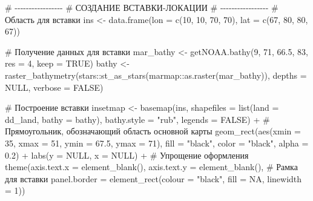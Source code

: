 \documentclass[
  letterpaper,
  DIV=11,
  numbers=noendperiod]{scrreprt}
\newenvironment{Shaded}{\begin{snugshade}}{\end{snugshade}}
\newcommand{\AttributeTok}[1]{\textcolor[rgb]{0.40,0.45,0.13}{#1}}
\newcommand{\CommentTok}[1]{\textcolor[rgb]{0.37,0.37,0.37}{#1}}
\newcommand{\ConstantTok}[1]{\textcolor[rgb]{0.56,0.35,0.01}{#1}}
\newcommand{\DecValTok}[1]{\textcolor[rgb]{0.68,0.00,0.00}{#1}}
\newcommand{\FloatTok}[1]{\textcolor[rgb]{0.68,0.00,0.00}{#1}}
\newcommand{\FunctionTok}[1]{\textcolor[rgb]{0.28,0.35,0.67}{#1}}
\newcommand{\NormalTok}[1]{\textcolor[rgb]{0.00,0.23,0.31}{#1}}
\newcommand{\OtherTok}[1]{\textcolor[rgb]{0.00,0.23,0.31}{#1}}
\newcommand{\SpecialCharTok}[1]{\textcolor[rgb]{0.37,0.37,0.37}{#1}}
\newcommand{\StringTok}[1]{\textcolor[rgb]{0.13,0.47,0.30}{#1}}
\begin{document}
\begin{Shaded}
\begin{Highlighting}[]
\CommentTok{\# {-}{-}{-}{-}{-}{-}{-}{-}{-}{-}{-}{-}{-}{-}{-}{-}{-}}
\CommentTok{\# СОЗДАНИЕ ВСТАВКИ{-}ЛОКАЦИИ}
\CommentTok{\# {-}{-}{-}{-}{-}{-}{-}{-}{-}{-}{-}{-}{-}{-}{-}{-}{-}}
\CommentTok{\# Область для вставки}
\NormalTok{ins }\OtherTok{\textless{}{-}} \FunctionTok{data.frame}\NormalTok{(}\AttributeTok{lon =} \FunctionTok{c}\NormalTok{(}\DecValTok{10}\NormalTok{, }\DecValTok{10}\NormalTok{, }\DecValTok{70}\NormalTok{, }\DecValTok{70}\NormalTok{), }\AttributeTok{lat =} \FunctionTok{c}\NormalTok{(}\DecValTok{67}\NormalTok{, }\DecValTok{80}\NormalTok{, }\DecValTok{80}\NormalTok{, }\DecValTok{67}\NormalTok{))}

\CommentTok{\# Получение данных для вставки}
\NormalTok{mar\_bathy }\OtherTok{\textless{}{-}} \FunctionTok{getNOAA.bathy}\NormalTok{(}\DecValTok{9}\NormalTok{, }\DecValTok{71}\NormalTok{, }\FloatTok{66.5}\NormalTok{, }\DecValTok{83}\NormalTok{, }\AttributeTok{res =} \DecValTok{4}\NormalTok{, }\AttributeTok{keep =} \ConstantTok{TRUE}\NormalTok{)}
\NormalTok{bathy }\OtherTok{\textless{}{-}} \FunctionTok{raster\_bathymetry}\NormalTok{(stars}\SpecialCharTok{::}\FunctionTok{st\_as\_stars}\NormalTok{(marmap}\SpecialCharTok{::}\FunctionTok{as.raster}\NormalTok{(mar\_bathy)), }
                           \AttributeTok{depths =} \ConstantTok{NULL}\NormalTok{, }\AttributeTok{verbose =} \ConstantTok{FALSE}\NormalTok{)}

\CommentTok{\# Построение вставки}
\NormalTok{insetmap }\OtherTok{\textless{}{-}} \FunctionTok{basemap}\NormalTok{(ins, }\AttributeTok{shapefiles =} \FunctionTok{list}\NormalTok{(}\AttributeTok{land =}\NormalTok{ dd\_land, }\AttributeTok{bathy =}\NormalTok{ bathy), }
                   \AttributeTok{bathy.style =} \StringTok{"rub"}\NormalTok{, }\AttributeTok{legends =} \ConstantTok{FALSE}\NormalTok{) }\SpecialCharTok{+}
  \CommentTok{\# Прямоугольник, обозначающий область основной карты}
  \FunctionTok{geom\_rect}\NormalTok{(}\FunctionTok{aes}\NormalTok{(}\AttributeTok{xmin =} \DecValTok{35}\NormalTok{, }\AttributeTok{xmax =} \DecValTok{51}\NormalTok{, }\AttributeTok{ymin =} \FloatTok{67.5}\NormalTok{, }\AttributeTok{ymax =} \DecValTok{71}\NormalTok{), }
            \AttributeTok{fill =} \StringTok{"black"}\NormalTok{, }\AttributeTok{color =} \StringTok{"black"}\NormalTok{, }\AttributeTok{alpha =} \FloatTok{0.2}\NormalTok{) }\SpecialCharTok{+}
  \FunctionTok{labs}\NormalTok{(}\AttributeTok{y =} \ConstantTok{NULL}\NormalTok{, }\AttributeTok{x =} \ConstantTok{NULL}\NormalTok{) }\SpecialCharTok{+}
  \CommentTok{\# Упрощение оформления}
  \FunctionTok{theme}\NormalTok{(}\AttributeTok{axis.text.x =} \FunctionTok{element\_blank}\NormalTok{(), }
        \AttributeTok{axis.text.y =} \FunctionTok{element\_blank}\NormalTok{(),}
        \CommentTok{\# Рамка для вставки}
        \AttributeTok{panel.border =} \FunctionTok{element\_rect}\NormalTok{(}\AttributeTok{colour =} \StringTok{"black"}\NormalTok{, }\AttributeTok{fill =} \ConstantTok{NA}\NormalTok{, }\AttributeTok{linewidth =} \DecValTok{1}\NormalTok{))}


\end{Highlighting}
\end{Shaded}
\end{document}
